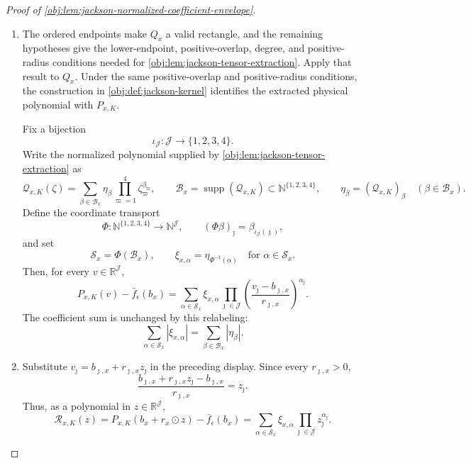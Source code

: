 \documentclass[11pt]{article}
\begin{document}
\begin{proof}[Proof of \cref{obj:lem:jackson-normalized-coefficient-envelope}]
\begin{enumerate}
\item The ordered endpoints make \(Q_x\) a valid rectangle, and the remaining hypotheses give the lower-endpoint, positive-overlap, degree, and positive-radius conditions needed for \cref{obj:lem:jackson-tensor-extraction}. Apply that result to \(Q_x\). Under the same positive-overlap and positive-radius conditions, the construction in \cref{obj:def:jackson-kernel} identifies the extracted physical polynomial with \(P_{x,K}\).

Fix a bijection
\[
\iota_{\mathcal J}:\mathcal J\longrightarrow \{1,2,3,4\}.
\]
Write the normalized polynomial supplied by \cref{obj:lem:jackson-tensor-extraction} as
\[
\mathcal Q_{x,K}(\zeta)
=
\sum_{\beta\in\mathcal B_x}
\eta_\beta
\prod_{\varpi=1}^4 \zeta_\varpi^{\beta_\varpi},
\qquad
\mathcal B_x=\operatorname{supp}(\mathcal Q_{x,K})
\subset \mathbb N^{\{1,2,3,4\}},
\qquad
\eta_\beta=(\mathcal Q_{x,K})_\beta
\quad(\beta\in\mathcal B_x).
\]
Define the coordinate transport
\[
\Phi:\mathbb N^{\{1,2,3,4\}}\longrightarrow \mathbb N^{\mathcal J},
\qquad
(\Phi\beta)_\jmath=\beta_{\iota_{\mathcal J}(\jmath)},
\]
and set
\[
\mathcal S_x=\Phi(\mathcal B_x),
\qquad
\xi_{x,\alpha}=\eta_{\Phi^{-1}(\alpha)}
\quad\text{for }\alpha\in\mathcal S_x.
\]
Then, for every \(v\in\mathbb R^{\mathcal J}\),
\[
P_{x,K}(v)-\bar f_\epsilon(b_x)
=
\sum_{\alpha\in\mathcal S_x}
\xi_{x,\alpha}
\prod_{\jmath\in\mathcal J}
\left(\frac{v_\jmath-b_{\jmath,x}}{r_{\jmath,x}}\right)^{\alpha_\jmath}.
\]
The coefficient sum is unchanged by this relabeling:
\[
\sum_{\alpha\in\mathcal S_x}|\xi_{x,\alpha}|
=
\sum_{\beta\in\mathcal B_x}|\eta_\beta|.
\]

\item\label{proof:jackson-normalized-coefficient-envelope:normalized-expansion} Substitute \(v_\jmath=b_{\jmath,x}+r_{\jmath,x}z_\jmath\) in the preceding display. Since every \(r_{\jmath,x}>0\),
\[
\frac{b_{\jmath,x}+r_{\jmath,x}z_\jmath-b_{\jmath,x}}{r_{\jmath,x}}
=
z_\jmath .
\]
Thus, as a polynomial in \(z\in\mathbb R^{\mathcal J}\),
\[
\mathcal R_{x,K}(z)
=
P_{x,K}(b_x+r_x\odot z)-\bar f_\epsilon(b_x)
=
\sum_{\alpha\in\mathcal S_x}
\xi_{x,\alpha}
\prod_{\jmath\in\mathcal J}z_\jmath^{\alpha_\jmath}.
\]


\end{enumerate}
\end{proof}
\end{document}
